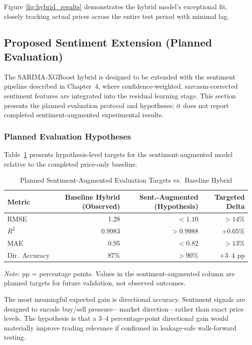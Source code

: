 Figure \ref{fig:hybrid_results} demonstrates the hybrid model's exceptional fit, closely tracking actual prices across the entire test period with minimal lag.

\subsection{Proposed Sentiment Extension (Planned Evaluation)}

The SARIMA-XGBoost hybrid is designed to be extended with the sentiment pipeline described in Chapter~4, where confidence-weighted, sarcasm-corrected sentiment features are integrated into the residual learning stage. This section presents the planned evaluation protocol and hypotheses; it does not report completed sentiment-augmented experimental results.

\subsubsection{Planned Evaluation Hypotheses}

Table~\ref{tab:sentiment_performance} presents hypothesis-level targets for the sentiment-augmented model relative to the completed price-only baseline.

\begin{table}[htbp]
\centering
\caption{Planned Sentiment-Augmented Evaluation Targets vs.\ Baseline Hybrid}
\label{tab:sentiment_performance}
\small
\begin{tabular}{@{}lrrr@{}}
\toprule
\textbf{Metric} & \textbf{Baseline Hybrid (Observed)} & \textbf{Sent.-Augmented (Hypothesis)} & \textbf{Targeted Delta} \\
\midrule
RMSE & 1.28 & $< 1.10$ & $> 14\%$ \\
$R^2$ & 0.9983 & $> 0.9988$ & $+0.05\%$ \\
MAE & 0.95 & $< 0.82$ & $> 13\%$ \\
Dir.\ Accuracy & 87\% & $> 90\%$ & $+3$--$4$ pp \\
\bottomrule
\end{tabular}
\vspace{0.2cm}

\raggedright
\small
\textit{Note}: pp = percentage points. Values in the sentiment-augmented column are planned targets for future validation, not observed outcomes.
\end{table}

The most meaningful expected gain is directional accuracy. Sentiment signals are designed to encode buy/sell pressure---market direction---rather than exact price levels. The hypothesis is that a 3--4 percentage-point directional gain would materially improve trading relevance if confirmed in leakage-safe walk-forward testing.

